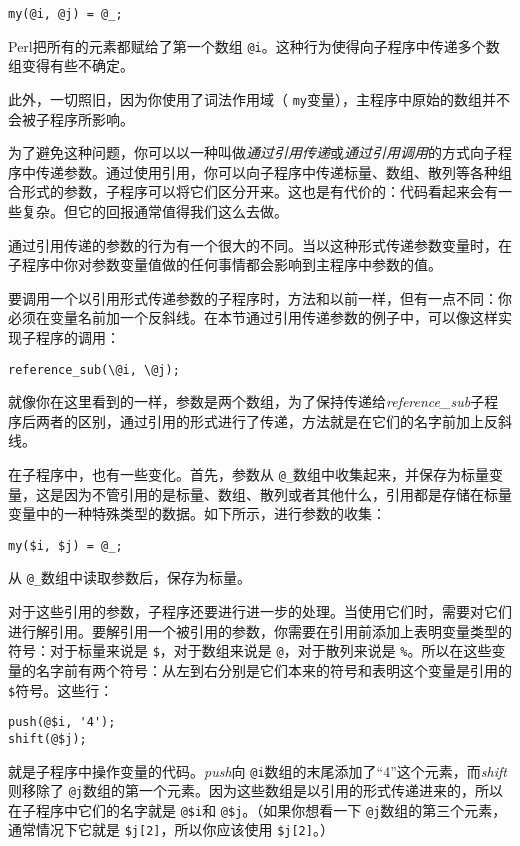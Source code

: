 \begin{lstlisting}
my(@i, @j) = @_;
\end{lstlisting}

Perl把所有的元素都赋给了第一个数组 \verb|@i|。这种行为使得向子程序中传递多个数组变得有些不确定。

此外，一切照旧，因为你使用了词法作用域（ \verb|my|变量），主程序中原始的数组并不会被子程序所影响。

为了避免这种问题，你可以以一种叫做\textit{通过引用传递}或\textit{通过引用调用}的方式向子程序中传递参数。通过使用引用，你可以向子程序中传递标量、数组、散列等各种组合形式的参数，子程序可以将它们区分开来。这也是有代价的：代码看起来会有一些复杂。但它的回报通常值得我们这么去做。

通过引用传递的参数的行为有一个很大的不同。当以这种形式传递参数变量时，在子程序中你对参数变量值做的任何事情都会影响到主程序中参数的值。

要调用一个以引用形式传递参数的子程序时，方法和以前一样，但有一点不同：你必须在变量名前加一个反斜线。在本节通过引用传递参数的例子中，可以像这样实现子程序的调用：

\begin{lstlisting}
reference_sub(\@i, \@j);
\end{lstlisting}

就像你在这里看到的一样，参数是两个数组，为了保持传递给\textit{reference\_sub}子程序后两者的区别，通过引用的形式进行了传递，方法就是在它们的名字前加上反斜线。

在子程序中，也有一些变化。首先，参数从 \verb|@_|数组中收集起来，并保存为标量变量，这是因为不管引用的是标量、数组、散列或者其他什么，引用都是存储在标量变量中的一种特殊类型的数据。如下所示，进行参数的收集：

\begin{lstlisting}
my($i, $j) = @_;
\end{lstlisting}


从 \verb|@_|数组中读取参数后，保存为标量。

对于这些引用的参数，子程序还要进行进一步的处理。当使用它们时，需要对它们进行解引用。要解引用一个被引用的参数，你需要在引用前添加上表明变量类型的符号：对于标量来说是 \verb|$|，对于数组来说是 \verb|@|，对于散列来说是 \verb|%|。所以在这些变量的名字前有两个符号：从左到右分别是它们本来的符号和表明这个变量是引用的 \verb|$|符号。这些行：

\begin{lstlisting}
push(@$i, '4');
shift(@$j);
\end{lstlisting}

就是子程序中操作变量的代码。\textit{push}向 \verb|@i|数组的末尾添加了“4”这个元素，而\textit{shift}则移除了 \verb|@j|数组的第一个元素。因为这些数组是以引用的形式传递进来的，所以在子程序中它们的名字就是 \verb|@$i|和 \verb|@$j|。（如果你想看一下 \verb|@j|数组的第三个元素，通常情况下它就是 \verb|$j[2]|，所以你应该使用 \verb|$j[2]|。）

